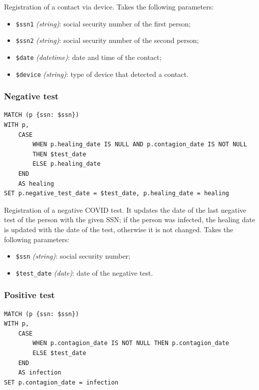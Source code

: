 \documentclass[12pt, a4paper]{article}
\begin{document}
\noindent %
Registration of a contact via device.
Takes the following parameters: 
\begin{itemize}
    \item \texttt{\$ssn1} \emph{(string)}: social security number of the 
        first person;
    \item \texttt{\$ssn2} \emph{(string)}: social security number of the
        second person;
    \item \texttt{\$date} \emph{(datetime)}: date and time of the contact;
    \item \texttt{\$device} \emph{(string)}: type of device that detected a 
        contact.
\end{itemize}

\subsubsection{Negative test}

\begin{tcolorbox}[fontupper=\scriptsize]
    \begin{verbatim}
MATCH (p {ssn: $ssn})
WITH p,
    CASE 
        WHEN p.healing_date IS NULL AND p.contagion_date IS NOT NULL 
        THEN $test_date
        ELSE p.healing_date
    END 
    AS healing
SET p.negative_test_date = $test_date, p.healing_date = healing
    \end{verbatim}
\end{tcolorbox}

\noindent %
Registration of a negative COVID test. It updates the date of the last negative test of the person with the given SSN; if the person was infected, the healing date is updated with the date of the test, otherwise it is not changed.
Takes the following parameters: 
\begin{itemize}
    \item \texttt{\$ssn} \emph{(string)}: social security number;
    \item \texttt{\$test\_date} \emph{(date)}: date of the negative test.

\end{itemize}

\subsubsection{Positive test}
\begin{tcolorbox}[fontupper=\scriptsize]
    \begin{verbatim}
MATCH (p {ssn: $ssn})
WITH p,
    CASE 
        WHEN p.contagion_date IS NOT NULL THEN p.contagion_date
        ELSE $test_date
    END 
    AS infection
SET p.contagion_date = infection
    \end{verbatim}
\end{tcolorbox}
\end{document}
